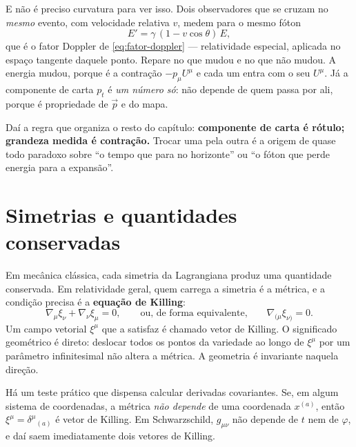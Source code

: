 \documentclass[12pt,a4paper,oneside]{book}
\theoremstyle{rgplain}
\theoremstyle{rgremark}
\begin{document}
E não é preciso curvatura para ver isso. Dois observadores que se cruzam no
\emph{mesmo} evento, com velocidade relativa $v$, medem para o mesmo fóton
\begin{equation}
  E'=\gamma\,(1-v\cos\theta)\,E ,
  \label{eq:doppler-local}
\end{equation}
que é o fator Doppler de \eqref{eq:fator-doppler} --- relatividade especial,
aplicada no espaço tangente daquele ponto. Repare no que mudou e no que não
mudou. A energia mudou, porque é a contração $-p_\mu U^\mu$ e cada um entra
com o seu $U^\mu$. Já a componente de carta $p_t$ é \emph{um número só}: não
depende de quem passa por ali, porque é propriedade de $\vec p$ e do mapa.

Daí a regra que organiza o resto do capítulo: \textbf{componente de carta é
rótulo; grandeza medida é contração.} Trocar uma pela outra é a origem de
quase todo paradoxo sobre ``o tempo que para no horizonte'' ou ``o fóton que
perde energia para a expansão''.

\section{Simetrias e quantidades conservadas}
\label{sec:simetrias-conservadas}

Em mecânica clássica, cada simetria da Lagrangiana produz uma quantidade
conservada. Em relatividade geral, quem carrega a simetria é a métrica, e a
condição precisa é a \textbf{equação de Killing}:
\begin{equation}
  \nabla_\mu\xi_\nu+\nabla_\nu\xi_\mu=0,
  \qquad\text{ou, de forma equivalente,}\qquad
  \nabla_{(\mu}\xi_{\nu)}=0.
  \label{eq:killing}
\end{equation}
Um campo vetorial $\xi^\mu$ que a satisfaz é chamado vetor de Killing. O
significado geométrico é direto: deslocar todos os pontos da variedade ao
longo de $\xi^\mu$ por um parâmetro infinitesimal não altera a métrica. A
geometria é invariante naquela direção.

Há um teste prático que dispensa calcular derivadas covariantes. Se, em
algum sistema de coordenadas, a métrica \emph{não depende} de uma coordenada
$x^{(a)}$, então $\xi^\mu=\delta^\mu{}_{(a)}$ é vetor de Killing. Em
Schwarzschild, $g_{\mu\nu}$ não depende de $t$ nem de $\varphi$, e daí saem
imediatamente dois vetores de Killing.
\end{document}
